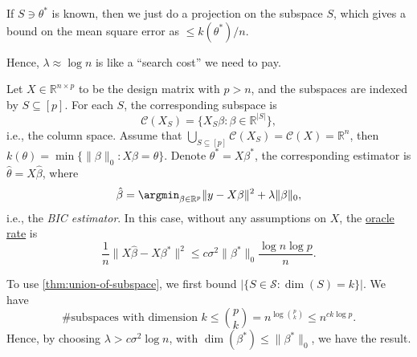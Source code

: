 \begin{remark}
	If \(S \ni \theta ^{\ast} \) is known, then we just do a projection on the subspace \(S\), which gives a bound on the mean square error as \(\leq k(\theta ^{\ast} ) / n\).
\end{remark}

\begin{intuition}
	Hence, \(\lambda \approx \log n\) is like a ``search cost'' we need to pay.
\end{intuition}

\begin{eg}
	Let \(X \in \mathbb{R} ^{n \times p}\) to be the design matrix with \(p > n\), and the subspaces are indexed by \(S \subseteq [p]\). For each \(S\), the corresponding subspace is
	\[
		\mathcal{C} (X_S) = \{ X_S \beta \colon \beta \in \mathbb{R} ^{\vert S \vert } \},
	\]
	i.e., the column space. Assume that \(\bigcup_{S \subseteq [p]} \mathcal{C} (X_S) = \mathcal{C} (X) = \mathbb{R} ^n\), then \(k(\theta ) = \min \{ \lVert \beta \rVert _0 \colon X \beta = \theta \} \). Denote \(\theta ^{\ast} = X \beta ^{\ast} \), the corresponding estimator is \(\hat{\theta} = X \hat{\beta} \), where
	\[
		\hat{\beta} = \argmin_{\beta \in \mathbb{R} ^p} \lVert y - X \beta \rVert ^2 + \lambda \lVert \beta \rVert _0,
	\]
	i.e., the \emph{BIC estimator}. In this case, without any assumptions on \(X\), the \hyperref[not:oracle-rate]{oracle rate} is
	\[
		\frac{1}{n} \lVert X \hat{\beta} - X \beta ^{\ast} \rVert ^2 \leq c \sigma ^2 \lVert \beta ^{\ast} \rVert _0 \frac{\log n \log p}{n}.
	\]
\end{eg}
\begin{explanation}
	To use \autoref{thm:union-of-subspace}, we first bound \(\vert \{ S \in \mathcal{S} \colon \dim (S) = k \}  \vert \). We have
	\[
		\#\text{subspaces with dimension \(k\)}
		\leq \binom{p}{k}
		= n^{\log \binom{p}{k}}
		\leq n^{c k \log p}.
	\]
	Hence, by choosing \(\lambda > c \sigma ^2 \log n\), with \(\dim (\beta ^{\ast} ) \leq \lVert \beta ^{\ast} \rVert _0\), we have the result.
\end{explanation}

